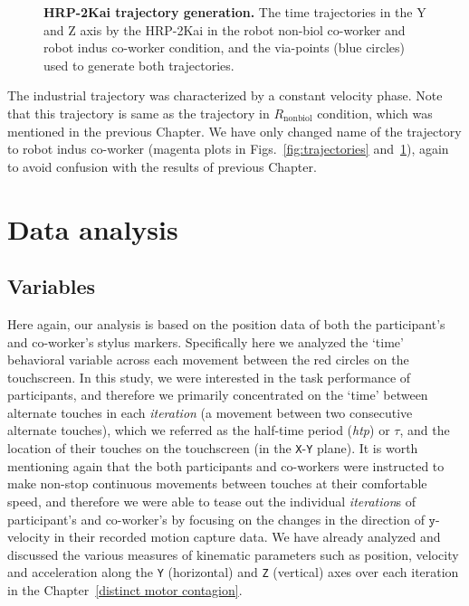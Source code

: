 \begin{figure}[hpt]
	\caption{{\bf HRP-2Kai trajectory generation.} The time trajectories in the Y and Z axis by the HRP-2Kai in the robot non-biol co-worker and robot indus co-worker condition, and the via-points (blue circles) used to generate both trajectories.}
	\label{fig:trajectories2}
\end{figure}


The industrial trajectory was characterized by a constant velocity phase. Note that this trajectory is same as the trajectory in $R_{\text{nonbiol}}$ condition, which was mentioned in the previous Chapter. We have only changed name of the trajectory to robot indus co-worker (magenta plots in Figs.~\ref{fig:trajectories} and~\ref{fig:trajectories2}), again to avoid confusion with the results of previous Chapter.
 

\section{Data analysis} \label{data_analysis}

\subsection{Variables}

Here again, our analysis is based on the position data of both the participant's and co-worker's stylus markers. Specifically here we analyzed the `time' behavioral variable across each movement between the red circles on the touchscreen. In this study, we were interested in the task performance of participants, and therefore we primarily concentrated on the `time' between alternate touches in each \textit{iteration} (a movement between two consecutive alternate touches), which we referred as the half-time period ({\it htp}) or $\tau$, and the location of their touches on the touchscreen (in the \texttt{X}-\texttt{Y} plane). It is worth mentioning again that the both participants and co-workers were instructed to make non-stop continuous movements between touches at their comfortable speed, and therefore we were able to tease out the individual \textit{iteration}s of participant's and co-worker's by focusing on the changes in the direction of $\texttt{y}$-velocity in their recorded motion capture data. We have already analyzed and discussed the various measures of kinematic parameters such as position, velocity and acceleration along the \texttt{Y} (horizontal) and \texttt{Z} (vertical) axes over each iteration in the Chapter~\ref{distinct motor contagion}.



